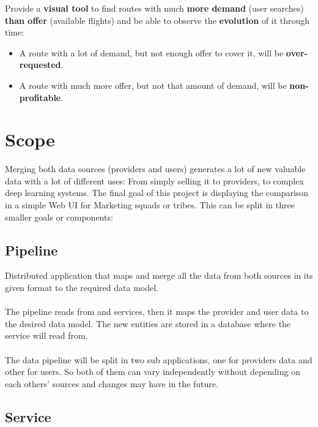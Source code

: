 \begin{displayquote}
Provide a \textbf{visual tool} to find routes with much \textbf{more demand} (user searches) \textbf{than offer} (available flights) and be able to observe the \textbf{evolution} of it through time:

\begin{itemize}
  \item A route with a lot of demand, but not enough offer to cover it, will be \textbf{over-requested}.
  \item A route with much more offer, but not that amount of demand, will be \textbf{non-profitable}.
\end{itemize}
\end{displayquote}


\section{Scope}

Merging both data sources (providers and users) generates a lot of new valuable data with a lot of different uses: From simply selling it to providers, to complex deep learning systems. The final goal of this project is displaying the comparison in a simple Web UI for Marketing squads or tribes. This can be split in three smaller goals or components:

\subsection{Pipeline}

Distributed application that maps and merge all the data from both sources in its given format to the required data model.
\\\\
The pipeline reads from  and  services, then it maps the provider and user data to the desired data model. The new entities are stored in a database where the service will read from.
\\\\
The data pipeline will be split in two sub applications, one for providers data and other for users. So both of them can vary independently without depending on each others' sources and changes may have in the future.

\subsection{Service}


